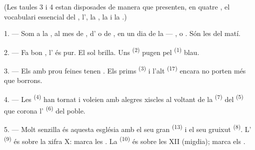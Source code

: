 
\VUsaut{3.0mm}
\VUsaut{1.6mm}
\VUsaut{3.4mm}

(Les taules 3 i 4 estan disposades de manera que presenten, en quatre
, el vocabulari essencial del , l',
la , la  i la .)
\VUsaut{4.0mm}

\VUsaut{3.0mm}

\VUsaut{2.4mm}

\VUsaut{3.0mm}

1. --- Som a la , al mes de , d' o
de , en un dia de la  --- ,
 o . Són les  del matí.

2. --- Fa bon , l' és pur. El sol brilla. Uns
 \textsuperscript{(2)} pugen pel 
\textsuperscript{(1)} blau.

3. --- Els  amb prou feines tenen . Els prims
 \textsuperscript{(3)} i l'alt 
\textsuperscript{(17)} encara no porten més que borrons.

4. --- Les  \textsuperscript{(4)} han tornat i voleien amb
alegres xiscles al voltant de la  \textsuperscript{(7)} del
 \textsuperscript{(5)} que corona l'
\textsuperscript{(6)} del poble.

\VUsaut{3.4mm}
\VUsaut{3.0mm}

5. --- Molt senzilla és aquesta església amb el seu gran 
\textsuperscript{(13)} i el seu gruixut  \textsuperscript{(8)}.
L' \textsuperscript{(9)} és sobre la xifra X: marca les
. La  \textsuperscript{(10)} és sobre les XII
(migdia); marca els .

